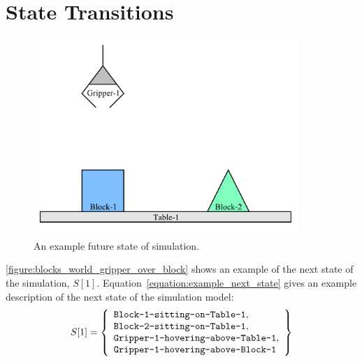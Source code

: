 \section{State Transitions}

\begin{figure}[bth]
\includegraphics[width=10cm]{gfx/blocks_world_gripper_over_block}
\caption{An example future state of simulation.}
\label{figure:blocks_world_gripper_over_block}
\end{figure}
\autoref{figure:blocks_world_gripper_over_block} shows an example of
the next state of the simulation, $S[1]$.
Equation~\ref{equation:example_next_state} gives an example
description of the next state of the simulation model:
\begin{equation}
\label{equation:example_next_state}
S[1] =
  \left\{
    \begin{array}{l}
      \text{{\tt Block-1-sitting-on-Table-1}}, \\
      \text{{\tt Block-2-sitting-on-Table-1}}, \\
      \text{{\tt Gripper-1-hovering-above-Table-1}}, \\
      \text{{\tt Gripper-1-hovering-above-Block-1}}
    \end{array}
  \right\}
\end{equation}


